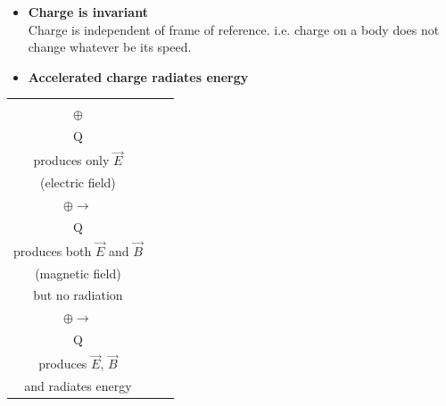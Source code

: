\begin{frame}[t]
	\frametitle{}
	
	\begin{itemize}
		\item<+-> \textbf{Charge is invariant} \\
		Charge is independent of frame of reference. i.e. charge on a body does not change whatever be its speed.
		
		\vspace{0.7em}
		
		\item<+-> \textbf{Accelerated charge radiates energy}
	\end{itemize}
	\vspace{0.5em}
	
	\noindent
	\begin{tabular}{|c|c|c|}
		\hline
		\onslide<+->{%
			\begin{minipage}[t]{0.28\textwidth}
				\centering
				$v = 0$ (i.e. at rest) \\[0.5em]
				$\oplus$ \\ Q \\[0.5em]
				produces only $\vec{E}$ \\ (electric field)
		\end{minipage}} &
		\onslide<+->{%
			\begin{minipage}[t]{0.28\textwidth}
				\centering
				$v = \text{constant}$ \\[0.5em]
				$\oplus \rightarrow$ \\ Q \\[0.5em]
				produces both $\vec{E}$ and $\vec{B}$ \\ (magnetic field) \\ but no radiation
		\end{minipage}} &
		\onslide<+->{%
			\begin{minipage}[t]{0.28\textwidth}
				\centering
				$v \neq \text{constant}$ (i.e. time varying) \\[0.5em]
				$\oplus \rightarrow$ \\ Q \\[0.5em]
				produces $\vec{E}$, $\vec{B}$ \\ and radiates energy
		\end{minipage}} \\
		\hline
	\end{tabular}
	
\end{frame}
